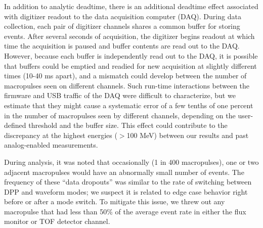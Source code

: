 \documentclass[twocolumn,secnumarabic,amssymb, nobibnotes, aps, prl,
superscriptaddress, nobalancelastpage]{revtex4}
\begin{document}
In addition to analytic deadtime, there is an additional deadtime effect associated with 
digitizer readout to the data acquisition computer (DAQ). During data
collection, each pair of digitizer channels shares a common buffer for storing events.
After several seconds of acquisition, the digitizer begins readout at which time the
acquisition is paused and buffer contents are read out to the DAQ. However,
because each buffer is independently read out to the DAQ, it is possible that buffers
could be emptied and readied for new acquisition at slightly different times
(10-40 ms apart), and a mismatch could develop between the number of macropulses
seen on different channels. Such run-time interactions between the firmware and USB
traffic of the DAQ were difficult to characterize, but we estimate that they might cause a 
systematic error of a few tenths of one percent in the number of macropulses seen
by different channels, depending on the user-defined 
threshold and the buffer size. This effect could contribute to the discrepancy at the
highest energies ($>$100 MeV) between our results and past analog-enabled
measurements.

During analysis, it was noted that occasionally (1 in 400 macropulses), one or two 
adjacent macropulses would have an abnormally small number of events. The frequency
of these ``data dropouts'' was similar to the rate of
switching between DPP and waveform modes; we suspect it is related to edge
case behavior right before or after a mode switch. To mitigate this issue,
we threw out any macropulse that had less than 50\% of the average event rate in either the
flux monitor or TOF detector channel.
\end{document}
